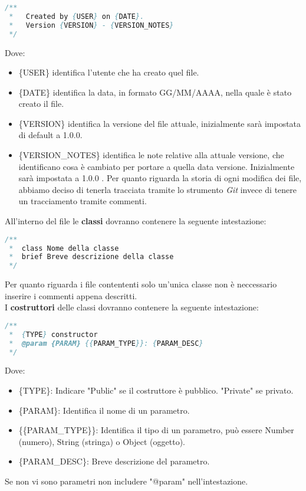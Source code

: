 \begin{lstlisting}[language=Java]
/** 
 *   Created by {USER} on {DATE}.
 *   Version {VERSION} - {VERSION_NOTES}
 */
\end{lstlisting}
Dove:
\begin{itemize}
\item \{USER\} identifica l'utente che ha creato quel file.
\item \{DATE\} identifica la data, in formato GG/MM/AAAA, nella quale è stato creato il file.
\item \{VERSION\} identifica la versione del file attuale, inizialmente sarà impostata di default a 1.0.0.
\item \{VERSION\_NOTES\} identifica le note relative alla attuale versione, che identificano cosa è cambiato per portare a quella data versione. Inizialmente sarà impostata a 1.0.0 .
Per quanto riguarda la storia di ogni modifica dei file, abbiamo deciso di tenerla tracciata tramite lo strumento \textit{Git} invece di tenere un tracciamento tramite commenti.
\end{itemize}



All'interno del file le \textbf{classi} dovranno contenere la seguente intestazione:

\begin{lstlisting}[language=Java]
/**
 *  class Nome della classe
 *  brief Breve descrizione della classe
 */
\end{lstlisting}

Per quanto riguarda i file contententi solo un'unica classe non è neccessario inserire i commenti appena descritti.
\\



I \textbf{costruttori} delle classi dovranno contenere la seguente intestazione:

\begin{lstlisting}[language=Java]
/**
 *  {TYPE} constructor
 *  @param {PARAM} {{PARAM_TYPE}}: {PARAM_DESC} 
 */
\end{lstlisting}
Dove:
\begin{itemize}
\item \{TYPE\}: Indicare "Public" se il costruttore è pubblico. "Private" se privato.
\item \{PARAM\}: Identifica il nome di un parametro.
\item \{\{PARAM\_TYPE\}\}: Identifica il tipo di un parametro, può essere Number (numero), String (stringa) o Object (oggetto).
\item \{PARAM\_DESC\}: Breve descrizione del parametro.
\end{itemize}
Se non vi sono parametri non includere "@param" nell'intestazione.
\\




